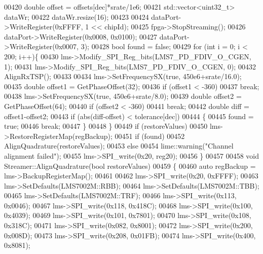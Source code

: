 \begin{DoxyCode}
00420     \textcolor{keywordtype}{double} offset = offsets[dec]*srate/1e6;
00421     std::vector<uint32\_t>  dataWr;
00422     dataWr.resize(16);
00423 
00424     dataPort->WriteRegister(0xFFFF, 1 << chipId);
00425     fpga->StopStreaming();
00426     dataPort->WriteRegister(0x0008, 0x0100);
00427     dataPort->WriteRegister(0x0007, 3);
00428     \textcolor{keywordtype}{bool} found = \textcolor{keyword}{false};
00429     \textcolor{keywordflow}{for} (\textcolor{keywordtype}{int} i = 0; i < 200; i++)\{
00430         lms->Modify_SPI_Reg_bits(LMS7_PD_FDIV_O_CGEN, 1);
00431         lms->Modify_SPI_Reg_bits(LMS7_PD_FDIV_O_CGEN, 0);
00432         AlignRxTSP();
00433 
00434         lms->SetFrequencySX(\textcolor{keyword}{true}, 450e6+srate/16.0);
00435         \textcolor{keywordtype}{double} offset1 = GetPhaseOffset(32);
00436         \textcolor{keywordflow}{if} (offset1 < -360)
00437             \textcolor{keywordflow}{break};
00438         lms->SetFrequencySX(\textcolor{keyword}{true}, 450e6+srate/8.0);
00439         \textcolor{keywordtype}{double} offset2 = GetPhaseOffset(64);
00440         \textcolor{keywordflow}{if} (offset2 < -360)
00441             \textcolor{keywordflow}{break};
00442         \textcolor{keywordtype}{double} diff = offset1-offset2;
00443         \textcolor{keywordflow}{if} (abs(diff-offset) < tolerance[dec])
00444         \{
00445             found = \textcolor{keyword}{true};
00446             \textcolor{keywordflow}{break};
00447         \}
00448     \}
00449     \textcolor{keywordflow}{if} (restoreValues)
00450         lms->RestoreRegisterMap(regBackup);
00451     \textcolor{keywordflow}{if} (found)
00452         AlignQuadrature(restoreValues);
00453     \textcolor{keywordflow}{else}
00454         lime::warning(\textcolor{stringliteral}{"Channel alignment failed"});
00455     lms->SPI_write(0x20, reg20);
00456 \}
00457 
00458 \textcolor{keywordtype}{void} Streamer::AlignQuadrature(\textcolor{keywordtype}{bool} restoreValues)
00459 \{
00460     \textcolor{keyword}{auto} regBackup = lms->BackupRegisterMap();
00461 
00462     lms->SPI_write(0x20, 0xFFFF);
00463     lms->SetDefaults(LMS7002M::RBB);
00464     lms->SetDefaults(LMS7002M::TBB);
00465     lms->SetDefaults(LMS7002M::TRF);
00466     lms->SPI_write(0x113, 0x0046);
00467     lms->SPI_write(0x118, 0x418C);
00468     lms->SPI_write(0x100, 0x4039);
00469     lms->SPI_write(0x101, 0x7801);
00470     lms->SPI_write(0x108, 0x318C);
00471     lms->SPI_write(0x082, 0x8001);
00472     lms->SPI_write(0x200, 0x008D);
00473     lms->SPI_write(0x208, 0x01FB);
00474     lms->SPI_write(0x400, 0x8081);

\end{DoxyCode}
